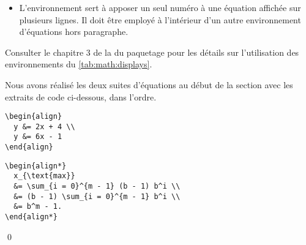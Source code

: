 \begin{itemize}
\begin{demo}
    \begin{texample}
\begin{lstlisting}
L'équation \eqref{eq:5} du
tableau `\ref*{tab:math:displays}' démontre que...
\end{lstlisting}
      \producing
      L'équation \eqref{eq:math:5} du tableau
      \ref*{tab:math:displays} démontre que\dots
    \end{texample}
  \end{demo}
\item L'environnement  sert à apposer un seul numéro à une
  équation affichée sur plusieurs lignes. Il doit être employé à
  l'intérieur d'un autre environnement d'équations hors paragraphe.
\end{itemize}
Consulter le chapitre 3 de la %
du paquetage  pour les détails sur
l'utilisation des environnements du \autoref*{tab:math:displays}.


\begin{exemple}
  Nous avons réalisé les deux suites d'équations au début de la
  section avec les extraits de code ci-dessous, dans l'ordre.
\begin{lstlisting}
\begin{align}
  y &= 2x + 4 \\
  y &= 6x - 1
\end{align}
\end{lstlisting}
\begin{lstlisting}
\begin{align*}
  x_{\text{max}}
  &= \sum_{i = 0}^{m - 1} (b - 1) b^i \\
  &= (b - 1) \sum_{i = 0}^{m - 1} b^i \\
  &= b^m - 1.
\end{align*}
\end{lstlisting}
  \qed
\end{exemple}


